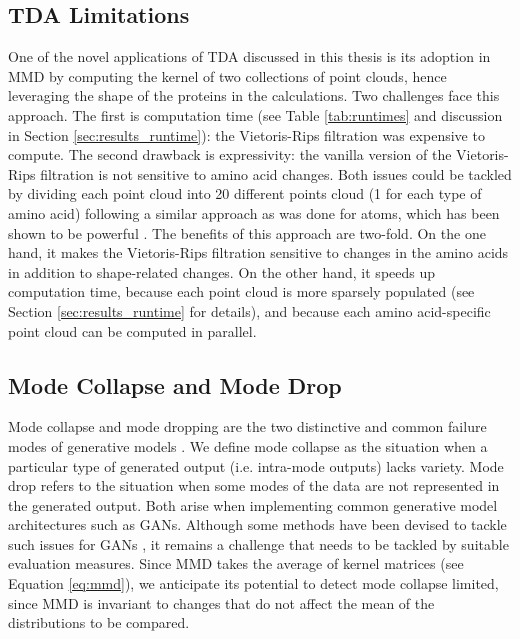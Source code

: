 
\subsection{TDA Limitations}\label{sec:tda_limitations}

One of the novel applications of TDA discussed in this thesis is its adoption in
MMD by computing the kernel of two collections of point clouds, hence leveraging
the shape of the proteins in the calculations. Two challenges face this
approach. The first is computation time (see Table \ref{tab:runtimes} and
discussion in Section \ref{sec:results_runtime}): the Vietoris-Rips filtration
was expensive to compute. The second drawback is expressivity: the vanilla
version of the Vietoris-Rips filtration is not sensitive to amino acid changes.
Both issues could be tackled by dividing each point cloud into 20 different
points cloud (1 for each type of amino acid) following a similar approach as was
done for atoms, which has been shown to be powerful \cite{jiang2021topological}.
The benefits of this approach are two-fold. On the one hand, it makes the
Vietoris-Rips filtration sensitive to changes in the amino acids in addition to
shape-related changes. On the other hand, it
speeds up computation time, because each point cloud is more sparsely populated
(see Section \ref{sec:results_runtime} for details), and because
each amino acid-specific point cloud can be computed in parallel.


\subsection{Mode Collapse and Mode Drop}

Mode collapse and mode dropping are the two distinctive and common failure modes
of generative models \citep{salimans2016improved}. We define mode collapse as
the situation when a particular type of generated output (i.e. intra-mode
outputs) lacks variety. Mode drop refers to the situation when some modes of the
data are not represented in the generated output. Both arise when implementing
common generative model architectures such as GANs. Although some methods have
been devised to tackle such issues for GANs \citep{arjovsky2017wasserstein,
goodfellow2014generative}, it remains a challenge that needs to be tackled by
suitable evaluation measures. Since MMD takes the average of kernel matrices
(see Equation \ref{eq:mmd}), we anticipate its potential to detect mode collapse
limited, since MMD is invariant to changes that do not affect the mean of the
distributions to be compared.

